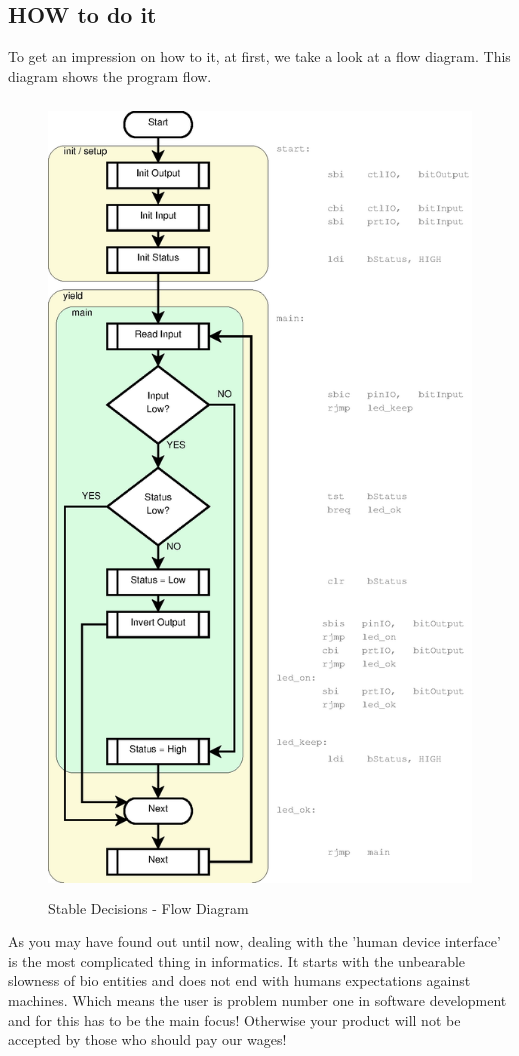 \subsection{HOW to do it}

To get an impression on how to it, at first, we take a look at a flow diagram. This diagram shows the program flow.

\begin{figure}[htbp]
  \centering
  \includegraphics[height=210mm]{LED/S005_stable-decisions+symbols.eps}
  \caption{Stable Decisions - Flow Diagram}
  \label{S005FlowDiagam}
\end{figure}

As you may have found out until now, dealing with the 'human device interface' is the most complicated thing in informatics. It starts with the unbearable slowness of bio entities and does not end with humans expectations against machines. Which means the user is problem number one in software development and for this has to be the main focus! Otherwise your product will not be accepted by those who should pay our wages!

